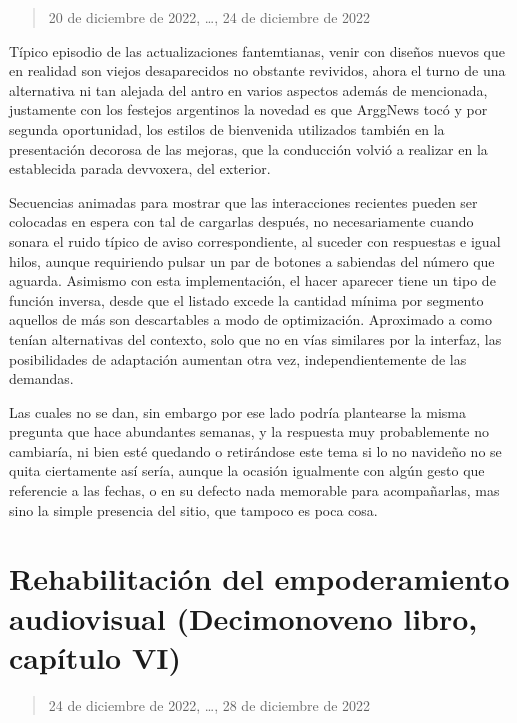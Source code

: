 \documentclass[
]{book}
\begin{document}
\begin{quote}
20 de diciembre de 2022, \ldots, 24 de diciembre de 2022
\end{quote}

Típico episodio de las actualizaciones fantemtianas, venir con diseños nuevos que en realidad son viejos desaparecidos no obstante revividos, ahora el turno de una alternativa ni tan alejada del antro en varios aspectos además de mencionada, justamente con los festejos argentinos la novedad es que ArggNews tocó y por segunda oportunidad, los estilos de bienvenida utilizados también en la presentación decorosa de las mejoras, que la conducción volvió a realizar en la establecida parada devvoxera, del exterior.

Secuencias animadas para mostrar que las interacciones recientes pueden ser colocadas en espera con tal de cargarlas después, no necesariamente cuando sonara el ruido típico de aviso correspondiente, al suceder con respuestas e igual hilos, aunque requiriendo pulsar un par de botones a sabiendas del número que aguarda. Asimismo con esta implementación, el hacer aparecer tiene un tipo de función inversa, desde que el listado excede la cantidad mínima por segmento aquellos de más son descartables a modo de optimización. Aproximado a como tenían alternativas del contexto, solo que no en vías similares por la interfaz, las posibilidades de adaptación aumentan otra vez, independientemente de las demandas.

Las cuales no se dan, sin embargo por ese lado podría plantearse la misma pregunta que hace abundantes semanas, y la respuesta muy probablemente no cambiaría, ni bien esté quedando o retirándose este tema si lo no navideño no se quita ciertamente así sería, aunque la ocasión igualmente con algún gesto que referencie a las fechas, o en su defecto nada memorable para acompañarlas, mas sino la simple presencia del sitio, que tampoco es poca cosa.

\hypertarget{rehabilitaciuxf3n-del-empoderamiento-audiovisual-decimonoveno-libro-capuxedtulo-vi}{%
\section{Rehabilitación del empoderamiento audiovisual (Decimonoveno libro, capítulo VI)}\label{rehabilitaciuxf3n-del-empoderamiento-audiovisual-decimonoveno-libro-capuxedtulo-vi}}

\begin{quote}
24 de diciembre de 2022, \ldots, 28 de diciembre de 2022
\end{quote}
\end{document}
